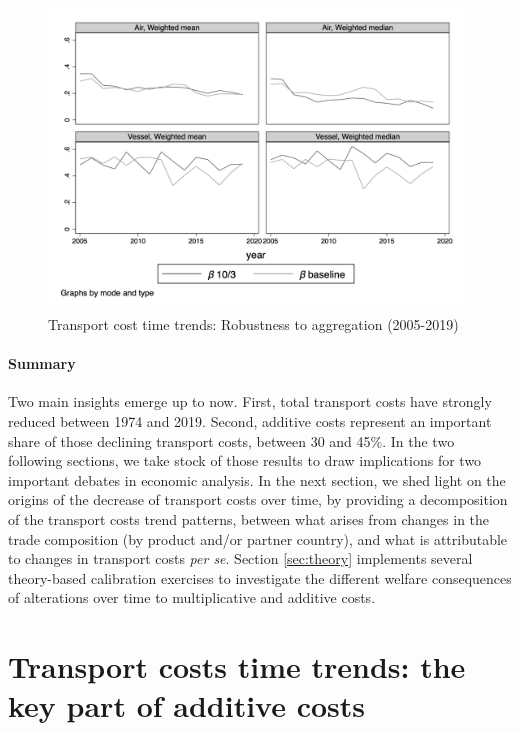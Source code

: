 \documentclass[a4paper,11pt]{article}
\begin{document}
\begin{figure}[htbp]
	\caption{Transport cost time trends: Robustness to aggregation (2005-2019)}
	\label{fig:robustness_to_agregation}
	\begin{center}
		\includegraphics[height=8cm]{scatter_chronology_baseline10_dbsamesample10_5_3.png}
	\end{center}
\end{figure}


\paragraph{Summary} Two main insights emerge up to now. First, total transport costs have strongly reduced between 1974 and 2019. Second, additive costs represent an important share of those declining transport costs, between 30 and 45\%. In the two following sections, we take stock of those results to draw implications for two important debates in economic analysis. In the next section, we shed light on the origins of the decrease of transport costs over time, by providing a decomposition of the transport costs trend patterns, between what arises from changes in the trade composition (by product and/or partner country), and what is attributable to changes in transport costs \emph{per se}. Section \ref{sec:theory} implements several theory-based calibration exercises to investigate the different welfare consequences of alterations over time to multiplicative and additive costs.


\section{Transport costs time trends: the key part of additive costs}\label{sec:results_trends}
\end{document}
